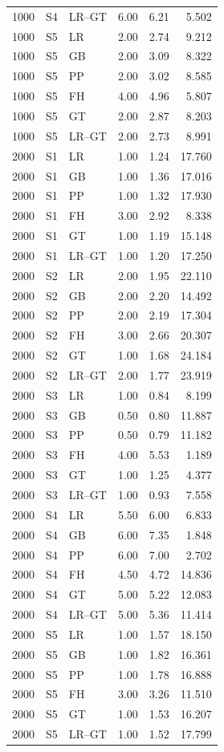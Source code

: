 \documentclass[12pt]{article}
\theoremstyle{definition}
\theoremstyle{remark}
\begin{document}
\begin{longtable}{rclrrr}
1000 & S4 & LR--GT & 6.00 & 6.21 & 5.502 \\
1000 & S5 & LR & 2.00 & 2.74 & 9.212 \\
1000 & S5 & GB & 2.00 & 3.09 & 8.322 \\
1000 & S5 & PP & 2.00 & 3.02 & 8.585 \\
1000 & S5 & FH & 4.00 & 4.96 & 5.807 \\
1000 & S5 & GT & 2.00 & 2.87 & 8.203 \\
1000 & S5 & LR--GT & 2.00 & 2.73 & 8.991 \\
2000 & S1 & LR & 1.00 & 1.24 & 17.760 \\
2000 & S1 & GB & 1.00 & 1.36 & 17.016 \\
2000 & S1 & PP & 1.00 & 1.32 & 17.930 \\
2000 & S1 & FH & 3.00 & 2.92 & 8.338 \\
2000 & S1 & GT & 1.00 & 1.19 & 15.148 \\
2000 & S1 & LR--GT & 1.00 & 1.20 & 17.250 \\
2000 & S2 & LR & 2.00 & 1.95 & 22.110 \\
2000 & S2 & GB & 2.00 & 2.20 & 14.492 \\
2000 & S2 & PP & 2.00 & 2.19 & 17.304 \\
2000 & S2 & FH & 3.00 & 2.66 & 20.307 \\
2000 & S2 & GT & 1.00 & 1.68 & 24.184 \\
2000 & S2 & LR--GT & 2.00 & 1.77 & 23.919 \\
2000 & S3 & LR & 1.00 & 0.84 & 8.199 \\
2000 & S3 & GB & 0.50 & 0.80 & 11.887 \\
2000 & S3 & PP & 0.50 & 0.79 & 11.182 \\
2000 & S3 & FH & 4.00 & 5.53 & 1.189 \\
2000 & S3 & GT & 1.00 & 1.25 & 4.377 \\
2000 & S3 & LR--GT & 1.00 & 0.93 & 7.558 \\
2000 & S4 & LR & 5.50 & 6.00 & 6.833 \\
2000 & S4 & GB & 6.00 & 7.35 & 1.848 \\
2000 & S4 & PP & 6.00 & 7.00 & 2.702 \\
2000 & S4 & FH & 4.50 & 4.72 & 14.836 \\
2000 & S4 & GT & 5.00 & 5.22 & 12.083 \\
2000 & S4 & LR--GT & 5.00 & 5.36 & 11.414 \\
2000 & S5 & LR & 1.00 & 1.57 & 18.150 \\
2000 & S5 & GB & 1.00 & 1.82 & 16.361 \\
2000 & S5 & PP & 1.00 & 1.78 & 16.888 \\
2000 & S5 & FH & 3.00 & 3.26 & 11.510 \\
2000 & S5 & GT & 1.00 & 1.53 & 16.207 \\
2000 & S5 & LR--GT & 1.00 & 1.52 & 17.799 \\
\end{longtable}
\endgroup
\end{document}
